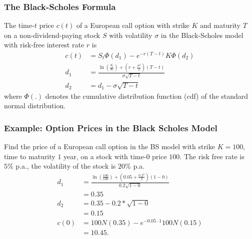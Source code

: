\begin{frame}[fragile]
\frametitle{The Black-Scholes Formula}
The time-$t$ price $c(t)$ of a European call option with strike $K$ and
maturity $T$ on a non-dividend-paying stock $S$ with volatility $\sigma$ in the
Black-Scholes model with risk-free interest rate $r$ is
\begin{align*}
  c(t) &= S_t \Phi(d_1) - e^{-r(T-t)}K\Phi(d_2)\\
  d_1 &= \frac{\ln \left(\frac{S_t}{K} \right) +
  \left(r+\frac{\sigma^2}{2}\right)(T-t)}{\sigma\sqrt{T-t}}\\
  d_2 &= d_1 - \sigma \sqrt{T-t}
\end{align*}
where $\Phi(.)$ denotes the cumulative distribution function (cdf) of the standard
normal distribution.
\end{frame}

\begin{frame}[fragile]
\frametitle{Example: Option Prices in the Black Scholes Model}
Find the price of a European call option in the BS model with strike $K=100$,
time to maturity $1$ year, on a stock with time-$0$ price $100$. The risk free
rate is $5\%$ p.a., the volatility of the stock is $20\%$ p.a.
\begin{align*}
  d_1&=\frac{\ln \left(\frac{100}{100} \right) +
  \left(0.05+\frac{0.2^2}{2}\right)(1-0)}{0.2 \sqrt{1-0}}\\&=0.35\\
  d_2&=0.35-0.2*\sqrt{1-0} \\&= 0.15\\
  c(0)&=100 N(0.35) - e^{-0.05\cdot 1}100N(0.15)\\&=10.45.
\end{align*}

\end{frame}




